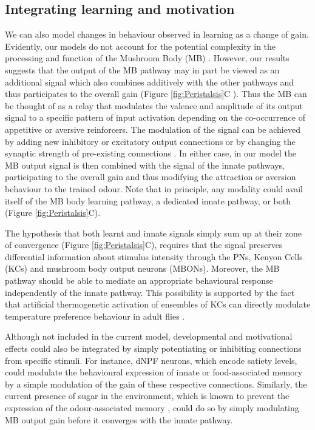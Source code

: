 \documentclass[11pt,a4paper]{article}
\newcommand{\todoBW}[1]{\todo[author=BW,color=orange, size=\tiny,inline]{#1}}
\begin{document}
\subsection{Integrating learning and motivation}

We can also model changes in behaviour observed in learning as a change of gain.
 Evidently, our models do not account for the potential complexity in the processing and function of the Mushroom Body (MB) \citep{gerber2004engram}.
 However, our results suggests that the output of the MB pathway  may in part be viewed as an additional signal which also combines additively with the other pathways and thus participates to the overall gain (Figure \ref{fig:Peristalsis}C ).
  Thus the MB can be thought of as a relay that modulates the valence and amplitude of its output signal to a specific pattern of input activation depending on the co-occurrence of appetitive or aversive reinforcers.
   The modulation of the signal can be achieved by adding new inhibitory or excitatory output connections or by changing the synaptic strength of pre-existing connections \citep{aso2014neuronal}.
    In either case, in our model the MB output signal is then combined with the signal of the innate pathways, participating to the overall gain and thus modifying the attraction or aversion behaviour to the trained odour.
 Note that in principle, any modality could avail itself of the MB body learning pathway, a dedicated innate pathway, or both (Figure \ref{fig:Peristalsis}C). 

The hypothesis that both learnt and innate signals simply sum up at their zone of convergence (Figure \ref{fig:Peristalsis}C), requires that the signal preserves differential information about stimulus intensity through the PNs, Kenyon Cells (KCs) and mushroom body output neurons (MBONs). Moreover, the MB pathway should be able to mediate an appropriate behavioural response independently of the innate pathway.
 This possibility is supported by the fact that artificial thermogenetic activation of ensembles of KCs can directly modulate temperature preference behaviour in adult flies \citep{vasmer2014induction}. 

Although not included in the current model, developmental \citep{gong2010two,wu2003developmental} and motivational \citep{krashes2009neural} %
 effects could also be integrated by simply potentiating or inhibiting connections from specific stimuli.
  For instance, dNPF neurons, which encode satiety levels, could modulate the behavioural expression of innate or food-associated memory \citep{krashes2009neural}  by a simple modulation of the gain of these respective connections.
   Similarly, the current presence of sugar in the environment, which is known to prevent the expression of the odour-associated memory \citep{schleyer2011behavior}, could do so by simply modulating MB output gain before it converges with the innate pathway. 
\end{document}
